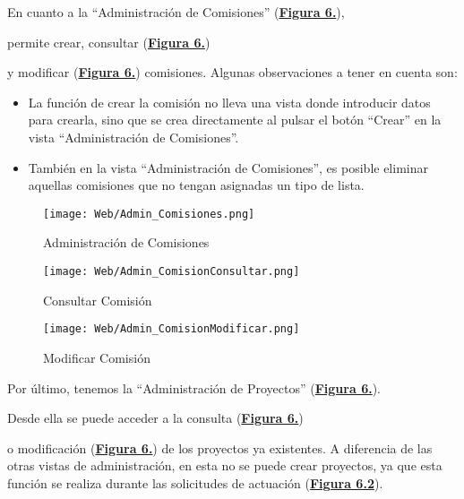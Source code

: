 \addtocounter{figura_manual}{1} En cuanto a la ``Administración de Comisiones'' (\textbf{\hyperref[fig:Web_Admin_Comisiones]{Figura 6.}}),\addtocounter{figura_manual}{1} permite crear, consultar (\textbf{\hyperref[fig:Web_Admin_ComisionConsultar]{Figura 6.}})\addtocounter{figura_manual}{1} y modificar (\textbf{\hyperref[fig:Web_Admin_ComisionModificar]{Figura 6.}}) comisiones. Algunas observaciones a tener en cuenta son:
\begin{itemize}
  \item La función de crear la comisión no lleva una vista donde introducir datos para crearla, sino que se crea directamente al pulsar el botón ``Crear'' en la vista ``Administración de Comisiones''.
  \item También en la vista ``Administración de Comisiones'', es posible eliminar aquellas comisiones que no tengan asignadas un tipo de lista.
\end{itemize}

\begin{figure}[!htbp]
  \centering
  \texttt{[image: Web/Admin\_Comisiones.png]}
  \caption{Administración de Comisiones}
  \label{fig:Web_Admin_Comisiones}
\end{figure}
\FloatBarrier

\begin{figure}[!htbp]
  \centering
  \texttt{[image: Web/Admin\_ComisionConsultar.png]}
  \caption{Consultar Comisión}
  \label{fig:Web_Admin_ComisionConsultar}
\end{figure}
\FloatBarrier

\begin{figure}[!htbp]
  \centering
  \texttt{[image: Web/Admin\_ComisionModificar.png]}
  \caption{Modificar Comisión}
  \label{fig:Web_Admin_ComisionModificar}
\end{figure}
\FloatBarrier

\addtocounter{figura_manual}{1} Por último, tenemos la ``Administración de Proyectos'' (\textbf{\hyperref[fig:Web_Admin_Proyectos]{Figura 6.}}).\addtocounter{figura_manual}{1} Desde ella se puede acceder a la consulta (\textbf{\hyperref[fig:Web_Admin_ProyectoConsultar]{Figura 6.}})\addtocounter{figura_manual}{1} o modificación (\textbf{\hyperref[fig:Web_Admin_ProyectoModificar]{Figura 6.}}) de los proyectos ya existentes. A diferencia de las otras vistas de administración, en esta no se puede crear proyectos, ya que esta función se realiza durante las solicitudes de actuación (\textbf{\hyperref[fig:Web_TAP_SolicitarActuacion]{Figura 6.2}}). 

